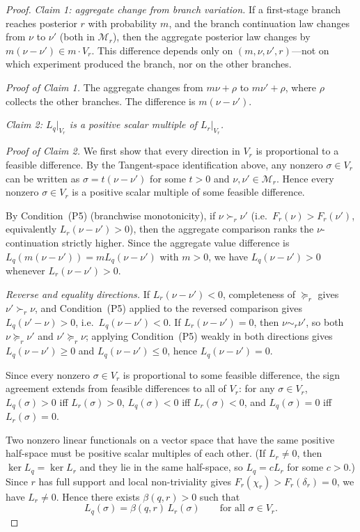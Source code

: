 \documentclass[11pt,a4paper]{article}
\theoremstyle{definition}
\newcommand{\1}{\mathbf 1}
\begin{document}
\begin{proof}
\emph{Claim 1: aggregate change from branch variation.}  If a first-stage branch reaches posterior $r$ with probability
$m$, and the branch continuation law changes from $\nu$ to $\nu'$ (both in $\mathcal M_r$), then the aggregate posterior
law changes by $m(\nu-\nu')\in m\cdot V_r$.  This difference depends only on $(m,\nu,\nu',r)$---not on which experiment
produced the branch, nor on the other branches.

\emph{Proof of Claim 1.}  The aggregate changes from $m\nu+\rho$ to $m\nu'+\rho$, where $\rho$ collects the other
branches.  The difference is $m(\nu-\nu')$.

\emph{Claim 2: $L_q|_{V_r}$ is a positive scalar multiple of $L_r|_{V_r}$.}

\emph{Proof of Claim 2.}  We first show that every direction in $V_r$ is proportional to a feasible difference.
By the Tangent-space identification above, any nonzero $\sigma\in V_r$ can be written as
$\sigma=t(\nu-\nu')$ for some $t>0$ and $\nu,\nu'\in\mathcal M_r$.  Hence every nonzero $\sigma\in V_r$ is a positive
scalar multiple of some feasible difference.

By Condition~\textup{(P5)} (branchwise monotonicity), if $\nu\succ_r\nu'$ (i.e.\ $F_r(\nu)>F_r(\nu')$, equivalently
$L_r(\nu-\nu')>0$), then the aggregate comparison ranks the $\nu$-continuation strictly higher.  Since the aggregate
value difference is $L_q(m(\nu-\nu'))=mL_q(\nu-\nu')$ with $m>0$, we have $L_q(\nu-\nu')>0$ whenever $L_r(\nu-\nu')>0$.

\emph{Reverse and equality directions.}  If $L_r(\nu-\nu')<0$, completeness of $\succeq_r$ gives $\nu'\succ_r\nu$, and
Condition~\textup{(P5)} applied to the reversed comparison gives $L_q(\nu'-\nu)>0$, i.e.\ $L_q(\nu-\nu')<0$.  If $L_r(\nu-\nu')=0$, then
$\nu\sim_r\nu'$, so both $\nu\succeq_r\nu'$ and $\nu'\succeq_r\nu$; applying Condition~\textup{(P5)} weakly in both directions gives
$L_q(\nu-\nu')\ge 0$ and $L_q(\nu-\nu')\le 0$, hence $L_q(\nu-\nu')=0$.

Since every nonzero $\sigma\in V_r$ is proportional to some feasible difference, the sign agreement extends from
feasible differences to all of $V_r$: for any $\sigma\in V_r$, $L_q(\sigma)>0$ iff $L_r(\sigma)>0$, $L_q(\sigma)<0$
iff $L_r(\sigma)<0$, and $L_q(\sigma)=0$ iff $L_r(\sigma)=0$.

Two nonzero linear functionals on a vector space that have the same positive half-space must be positive scalar
multiples of each other.  (If $L_r\ne 0$, then $\ker L_q=\ker L_r$ and they lie in the same half-space, so $L_q=cL_r$
for some $c>0$.)  Since $r$ has full support and local non-triviality gives $F_r(\chi_r)>F_r(\delta_r)=0$, we have
$L_r\ne 0$.  Hence there exists $\beta(q,r)>0$ such that
\[
L_q(\sigma)=\beta(q,r)\,L_r(\sigma)
\qquad\text{for all }\sigma\in V_r.
\]


\end{proof}
\end{document}
